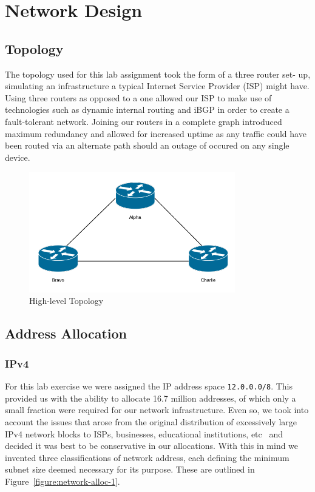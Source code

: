 \chapter{Network Design}

\section{Topology}

The topology used for this lab assignment took the form of a three router set-
up, simulating an infrastructure a typical Internet Service Provider (ISP)
might have. Using three routers as opposed to a one allowed our ISP to make use
of technologies such as dynamic internal routing and iBGP in order to create a
fault-tolerant network. Joining our routers in a complete graph introduced
maximum redundancy and allowed for increased uptime as any traffic could have
been routed via an alternate path should an outage of occured on any single
device.

\begin{figure}[!ht]
    \caption{High-level Topology}
    \centering
    \includegraphics[width=0.8\textwidth]{images/networkTopology.png}
\end{figure}

\section{Address Allocation}
\subsection{IPv4}
For this lab exercise we were assigned the IP address space
\texttt{12.0.0.0/8}. This provided us with the ability to allocate 16.7 million
addresses, of which only a small fraction were required for our network
infrastructure. Even so, we took into account the issues that arose from the
original distribution of excessively large IPv4 network blocks to ISPs,
businesses, educational institutions, etc~\cite{ipv4alloc}\cite{internetmap}
and decided it was best to be conservative in our allocations. With this in
mind we invented three classifications of network address, each defining the
minimum subnet size deemed necessary for its purpose. These are outlined in
Figure~\ref{figure:network-alloc-1}.

